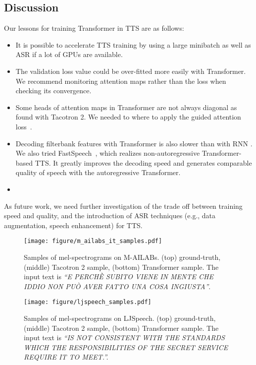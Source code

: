 \subsection{Discussion}
Our lessons for training Transformer in TTS are as follows:
{
\setlength{\leftmargini}{15pt}  
\begin{itemize}
	\setlength{\itemsep}{1pt}      \setlength{\parskip}{0pt}      \setlength{\itemindent}{0pt}   \setlength{\labelsep}{4pt}     \item It is possible to accelerate TTS training by using a large minibatch as well as ASR if a lot of GPUs are available.
    \item The validation loss value could be over-fitted more easily with Transformer. We recommend monitoring attention maps rather than the loss when checking its convergence.
    \item Some heads of attention maps in Transformer are not always diagonal as found with Tacotron 2. We needed to  where to apply the guided attention loss~\cite{tachibana2018efficiently}.
    \item Decoding filterbank features with Transformer is also slower than with RNN . We also tried FastSpeech~\cite{fastspeech}, which realizes non-autoregressive Transformer-based TTS. It greatly improves the decoding speed  and generates comparable quality of speech with the autoregressive Transformer.
    \item {}
\end{itemize}
}
As future work, we need further investigation of the trade off between training speed and quality, and the introduction of ASR techniques (e.g., data augmentation, speech enhancement) for TTS. 


\begin{figure}[t!]
    \centering
    \texttt{[image: figure/m\_ailabs\_it\_samples.pdf]}
    \vspace{-10mm}
    \caption{Samples of mel-spectrograms on M-AILABs. (top) ground-truth, (middle) Tacotron 2 sample, (bottom) Transformer sample. The input text is {\it ``E PERCHÈ SUBITO VIENE IN MENTE CHE IDDIO NON PUÒ AVER FATTO UNA COSA INGIUSTA''}.}
    \label{fig:tts_sample1}
    \vspace{-3mm}
\end{figure}
\begin{figure}[t!]
    \centering
    \texttt{[image: figure/ljspeech\_samples.pdf]}
    \vspace{-10mm}
    \caption{Samples of mel-spectrograms on LJSpeech. (top) ground-truth, (middle) Tacotron 2 sample, (bottom) Transformer sample. The input text is {\it ``IS NOT CONSISTENT WITH THE STANDARDS WHICH THE RESPONSIBILITIES OF THE SECRET SERVICE REQUIRE IT TO MEET.''.}}
    \label{fig:tts_sample2}
    \vspace{-5mm}
\end{figure}

